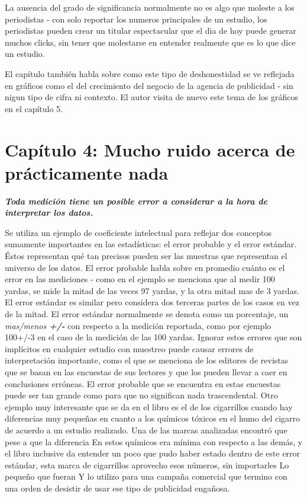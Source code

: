 \documentclass[letterpaper, 11pt]{article}
\begin{document}
La ausencia del grado de significancia normalmente no es algo que moleste a los periodistas - con solo reportar los numeros principales de un estudio, los periodistas pueden crear un titular espectacular que el dia de hoy puede generar muchos clicks, sin tener que molestarse en entender realmente que es lo que dice un estudio. 

El capítulo también habla sobre como este tipo de deshonestidad se ve reflejada en gráficos como el del crecimiento del negocio de la agencia de publicidad - sin nigun tipo de cifra ni contexto. El autor visita de nuevo este tema de los gráficos en el capítulo 5.


\section*{Capítulo 4: Mucho ruido acerca de prácticamente nada}

\textbf{\textit{Toda medición tiene un posible error a considerar a la hora de interpretar los datos.}}

Se utiliza un ejemplo de coeficiente intelectual para reflejar dos conceptos sumamente importantes en las estadísticas: el error probable y el error estándar. Éstos representan qué tan precisos pueden ser las muestras que representan el universo de los datos. El error probable habla sobre en promedio cuánto es el error en las mediciones - como en el ejemplo se menciona que al medir 100 yardas, se mide la mitad de las veces 97 yardas, y la otra mitad mas de 3 yardas. El error estándar es similar pero considera dos terceras partes de los casos en vez de la mitad.
El error estándar normalmente se denota como un porcentaje, un \textit{mas/menos \textbf{+/-}} con respecto a la medición reportada, como por ejemplo 100+/-3 en el caso de la medición de las 100 yardas.
Ignorar estos errores que son implícitos en cualquier estudio con muestreo puede causar errores de interpretación importante, como el que se menciona de los editores de revistas que se basan en las encuestas de sus lectores y que los pueden llevar a caer en conclusiones erróneas. El error probable que se encuentra en estas encuestas puede ser tan grande como para que no significan nada trascendental.
Otro ejemplo muy interesante que se da en el libro es el de los cigarrillos cuando hay diferencias muy pequeñas en cuanto a los químicos tóxicos en el humo del cigarro de acuerdo a un estudio realizado. Una de las marcas analizadas encontró que pese a que la diferencia En estos químicos era mínima con respecto a las demás, y el libro inclusive da entender un poco que pudo haber estado dentro de este error estándar, esta marca de cigarrillos aprovecho esos números, sin importarles Lo pequeño que fueran Y lo utilizo para una campaña comercial que termino con una orden de desistir de usar ese tipo de publicidad engañosa.
\end{document}
